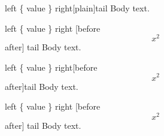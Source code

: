 
\begin{escapedargs}{left \{ value \} right}[plain]{tail}
Body text.
\end{escapedargs}

\begin{escapedargs}
{left \{ value \} right}
[before \[x^2\] after]
{tail}
Body text.
\end{escapedargs}

\begin{escapedargs}{left \{ value \} right}[before \[x^2\] after]{tail}
Body text.
\end{escapedargs}

\begin{escapedargs}
{left \{ value \} right}
[before \[x^2\] after]%
{tail}
Body text.
\end{escapedargs}
